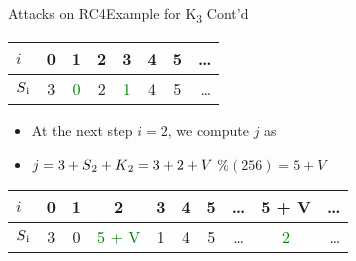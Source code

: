 \documentclass[
	aspectratio=169,	%
	onlytextwidth,		%
	t,					%
	]{beamer}
\begin{document}
\begin{frame}[fragile]{Attacks on RC4}{Example for K\textsubscript{3} Cont'd}

	\begin{table}[h!]
		\begin{center}
			\begin{tabular}{l|c|c|c|c|c|c|r}
			$i$ & 0 & 1 & 2 & 3 & 4 & 5 & \dots\\
			\hline
			$S\textsubscript{i}$ & 3 & \textcolor{green}{0} & 2 & \textcolor{green}{1} & 4 & 5 & \dots\\
			\end{tabular}
		\end{center}
	\end{table}

	\begin{itemize}
		\item At the next step $i = 2$, we compute $j$ as
		\item $j = 3 + S\textsubscript{2} + K\textsubscript{2} = 3 + 2 + V$ $\%(256) = 5+V$
	\end{itemize}

	\begin{table}[h!]
		\begin{center}
			\begin{tabular}{l|c|c|c|c|c|c|c|c|r}
			$i$ & 0 & 1 & 2 & 3 & 4 & 5 & \dots & 5 + V & \dots\\
			\hline
			$S\textsubscript{i}$ & 3 & 0 & \textcolor{green}{5 + V} & 1 & 4 & 5 & \dots & \textcolor{green}{2} & \dots\\
			\end{tabular}
		\end{center}
	\end{table}

\end{frame}
\end{document}
